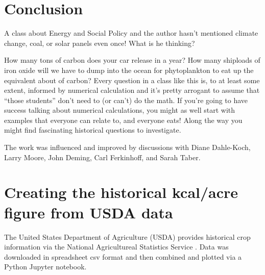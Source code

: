 \documentclass[12pt]{iopart}
\begin{document}
\section{Conclusion}
A class about Energy and Social Policy and the author hasn't mentioned climate change, coal, or solar panels even once!  What is he thinking?  

How many tons of carbon does your car release in a year? How many shiploads of iron oxide will we have to dump into the ocean for phytoplankton to eat up the equivalent about of carbon?  Every question in a class like this is, to at least some extent, informed by numerical calculation and it's pretty arrogant to assume that ``those students'' don't need to (or can't) do the math.  If you're going to have success talking about numerical calculations, you might as well start with examples that everyone can relate to, and everyone eats!  Along the way you might find fascinating historical questions to investigate.   









\ack
The work was influenced and improved by discussions with 
Diane Dahle-Koch, 
Larry Moore, 
John Deming, 
Carl Ferkinhoff, 
and Sarah Taber.

\clearpage
\appendix
\section{Creating the historical kcal/acre figure from USDA data}
\label{how_yield_plot_is_made}
The United States Department of Agriculture (USDA) provides historical crop information via the National Agricultureal Statistics Service 
\cite{USDA_NASS} .
Data was downloaded in spreadsheet csv format and then combined and plotted via a Python Jupyter notebook.   
\end{document}
